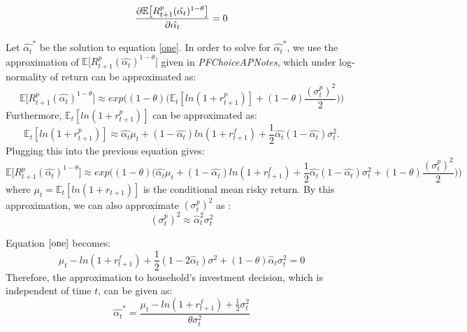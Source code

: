 \documentclass[12pt,a4paper]{article}
\begin{document}
\begin{equation}\label{one}
    \pdv{\mathbb{E}\big[R_{t+1}^p(\hat{\alpha_t})^{1-\theta}\big]}{\hat{\alpha_t}}=0
\end{equation}

Let $\hat{\alpha_t}^{*}$ be the solution to equation \eqref{one}. In order to solve for  $\hat{\alpha_t}^{*}$, we use the approximation of $\mathbb{E}\big[R_{t+1}^p(\hat{\alpha_t})^{1-\theta}\big]$ given in  \textit{PFChoiceAPNotes}, which under log-normality of return can be approximated as:
\begin{equation*}
  \mathbb{E}\big[R_{t+1}^p(\hat{\alpha_t})^{1-\theta}\big] \approx  exp\bigg((1-\theta)\bigg(\mathbb{E}_t[ln(1+r^p_{t+1})]+(1-\theta)\frac{(\sigma_t^p)^2}{2}\bigg) \bigg)
\end{equation*}
Furthermore,
 $\mathbb{E}_t[ln(1+r^p_{t+1})]$ can be approximated as:
\begin{equation*}
    \mathbb{E}_t[ln(1+r^p_{t+1})]\approx \hat{\alpha_t}\mu_t +(1-\hat{\alpha_t})ln(1+r^f_{t+1})+\frac{1}{2}\hat{\alpha_t}(1-\hat{\alpha_t})\sigma_t^2.
\end{equation*}
Plugging this into the previous equation gives:
\begin{equation*}
 \mathbb{E}\big[R_{t+1}^p(\hat{\alpha_t})^{1-\theta}\big]\approx exp\bigg((1-\theta)\bigg(\hat{\alpha_t}\mu_t +(1-\hat{\alpha_t})ln(1+r^f_{t+1})+\frac{1}{2}\hat{\alpha_t}(1-\hat{\alpha_t})\sigma_t^2+(1-\theta)\frac{(\sigma_t^p)^2}{2}\bigg) \bigg)
\end{equation*}
where $\mu_t=\mathbb{E}_t[ln(1+r_{t+1})]$ is the conditional mean risky return. By this approximation, we can also approximate $(\sigma_t^p)^2$ as :
\begin{equation*}
    (\sigma_t^p)^2\approx\hat{\alpha}_t^2\sigma_t^2
\end{equation*}

Equation $\eqref{one}$ becomes:
\begin{equation*}
 \mu_t-ln(1+r^f_{t+1})+\frac{1}{2}(1-2\hat{\alpha}_t)\sigma^2+(1-\theta)\hat{\alpha}_t\sigma_t^2=0
\end{equation*}
Therefore, the approximation to household's investment decision, which is independent of time $t$, can be given as:
\begin{equation*}
    \hat{\alpha_t}^{*}=\frac{\mu_t-ln(1+r^f_{t+1})+\frac{1}{2}\sigma_t^2}{\theta\sigma_t^2}
\end{equation*}
\end{document}
